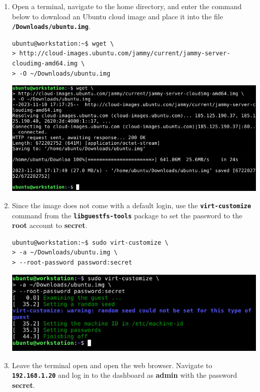 \documentclass[letterpaper, 12pt]{article}
\begin{document}
\begin{enumerate}
    \item Open a terminal, navigate to the home directory, and enter the command below to download an Ubuntu cloud image
    and place it into the file \textbf{\texttt{\texttildemid/Downloads/ubuntu.img}}.
\begin{lstlisting}
ubuntu@workstation:~$ wget \
> http://cloud-images.ubuntu.com/jammy/current/jammy-server-cloudimg-amd64.img \
> -O ~/Downloads/ubuntu.img
\end{lstlisting}

    \begin{center}
        \includegraphics[width=\linewidth]{images/part1/step1.png}
    \end{center}

    \item Since the image does not come with a default login, use the \textbf{\texttt{virt-customize}} command from the
    \textbf{\texttt{libguestfs-tools}} package to set the password to the \textbf{root} account to \textbf{secret}.
\begin{lstlisting}
ubuntu@workstation:~$ sudo virt-customize \
> -a ~/Downloads/ubuntu.img \
> --root-password password:secret
\end{lstlisting}

    \begin{center}
        \includegraphics[width=\linewidth]{images/part1/step2.png}
    \end{center}

    \item Leave the terminal open and open the web browser. Navigate to \textbf{\texttt{192.168.1.20}} and log in to the
    dashboard as \textbf{admin} with the password \textbf{secret}.


\end{enumerate}
\end{document}
